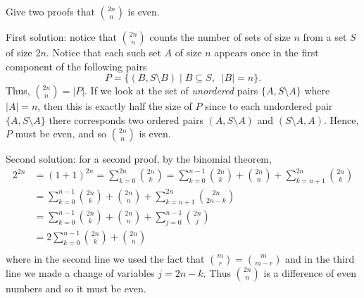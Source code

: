 \documentclass[11pt,dvipsnames]{book}
\numberwithin{equation}{section} %
\numberwithin{figure}{section} %
\numberwithin{table}{section} %
\begin{document}
 
 \begin{exercise}
  Give two proofs that ${2n\choose n}$ is even.
  \begin{solution}
  First solution: notice that ${2n\choose n}$ counts the number of sets of size $n$ from a set $S$ of size $2n$. Notice that each such set $A$ of size $n$ appears once in the first component of the following pairs
 \[P=\{(B,S\setminus B) \; | \; B\subseteq S,\;\; |B|=n\}.\]
Thus, ${2n\choose n}=|P|$. If we look at the set of {\it unordered} pairs $\{A,S\setminus A\}$ where $|A|=n$, then this is exactly half the size of $P$ since to each undordered pair $\{A,S\setminus A\}$ there corresponds two ordered pairs $(A,S\setminus A)$ and $(S\setminus A,A)$. Hence, $P$ must be even, and so ${2n \choose n}$ is even. \\
\end{solution}

\begin{solution}
Second solution: for a second proof, by the binomial theorem,
\begin{align*}
2^{2n} & = (1+1)^{2n} = \sum_{k=0}^{2n} {2n\choose k}
=\sum_{k=0}^{n-1} {2n\choose k}+{2n\choose n}+\sum_{k=n+1}^{2n} {2n\choose k}\\
& =\sum_{k=0}^{n-1} {2n\choose k}+{2n\choose n}+\sum_{k=n+1}^{2n} {2n\choose 2n-k}\\ 
& =\sum_{k=0}^{n-1} {2n\choose k}+{2n\choose n}+\sum_{j=0}^{n-1} {2n\choose j}\\ 
& = 2 \sum_{k=0}^{n-1} {2n\choose k}+{2n\choose n}\\ 
\end{align*}
where in the second line we used the fact that ${m \choose r} = {m \choose m-r}$ and in the third line we made a change of variables $j = 2n-k$. Thus ${2n\choose n}$ is a difference of even numbers and so it must be even.
\end{solution}
\end{exercise}
\end{document}
